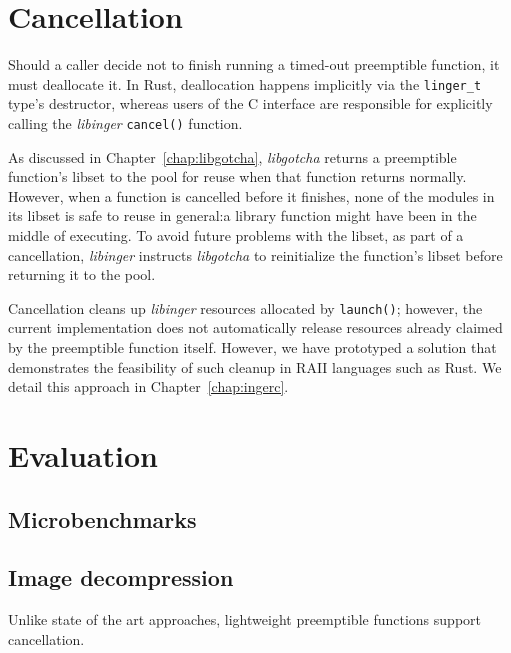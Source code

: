 \begin{promotesubsections}









\end{promotesubsections}




\section{Cancellation}

Should a caller decide not to finish running a timed-out preemptible function, it
must deallocate it.  In Rust, deallocation happens implicitly via the
\texttt{linger\_t} type's destructor, whereas users of the C interface are responsible
for explicitly calling the \textit{libinger} \texttt{cancel()} function.

As discussed in Chapter~\ref{chap:libgotcha}, \textit{libgotcha} returns a
preemptible function's libset to the pool for reuse when that function returns
normally.  However, when a function is cancelled before it finishes, none of the
modules in its libset is safe to reuse in general:\@ a library function might have
been in the middle of executing.  To avoid future problems with the libset, as part
of a cancellation, \textit{libinger} instructs \textit{libgotcha} to reinitialize the
function's libset before returning it to the pool.

Cancellation cleans up \textit{libinger} resources allocated by \texttt{launch()};
however, the current implementation does not automatically release resources already
claimed by the preemptible function itself.  However, we have prototyped a solution
that demonstrates the feasibility of such cleanup in RAII languages such as Rust.
We detail this approach in Chapter~\ref{chap:ingerc}.


\section{Evaluation}




\subsection{Microbenchmarks}




\subsection{Image decompression}

Unlike state of the art approaches, lightweight preemptible functions support
cancellation.
\begin{sloppypar}

\end{sloppypar}
